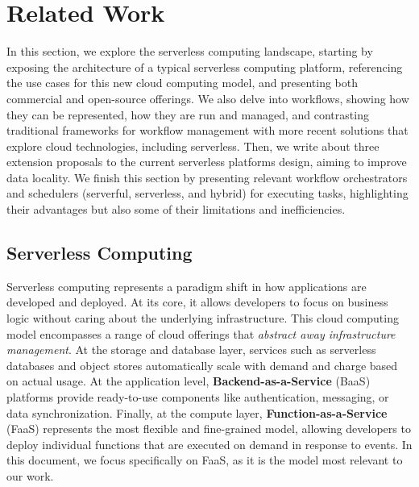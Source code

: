 \chapter{Related Work}
\chaptoc
\label{chap:rw}
\bigskip

In this section, we explore the serverless computing landscape, starting by exposing the architecture of a typical serverless computing platform, referencing the use cases for this new cloud computing model, and presenting both commercial and open-source offerings. We also delve into workflows, showing how they can be represented, how they are run and managed, and contrasting traditional frameworks for workflow management with more recent solutions that explore cloud technologies, including serverless. Then, we write about three extension proposals to the current serverless platforms design, aiming to improve data locality. We finish this section by presenting relevant workflow orchestrators and schedulers (serverful, serverless, and hybrid) for executing tasks, highlighting their advantages but also some of their limitations and inefficiencies.

\section{Serverless Computing}

Serverless computing represents a paradigm shift in how applications are developed and deployed. At its core, it allows developers to focus on business logic without caring about the underlying infrastructure. This cloud computing model encompasses a range of cloud offerings that \textit{abstract away infrastructure management}. At the storage and database layer, services such as serverless databases and object stores automatically scale with demand and charge based on actual usage. At the application level, \textbf{Backend-as-a-Service} (BaaS) platforms provide ready-to-use components like authentication, messaging, or data synchronization. Finally, at the compute layer, \textbf{Function-as-a-Service} (FaaS) represents the most flexible and fine-grained model, allowing developers to deploy individual functions that are executed on demand in response to events. In this document, we focus specifically on FaaS, as it is the model most relevant to our work.


